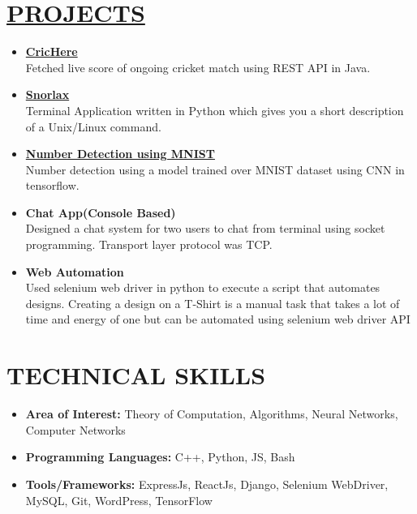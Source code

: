 \documentclass[line, margin, 12pt]{res}
\begin{document}
\begin{resume}
\section{\hyperref[https://www.github.com/darshansharma]{PROJECTS}}
\begin{itemize}
\item \textbf{\href{https://github.com/darshansharma/CricHere/blob/master/src/test/Test.java}{CricHere}}\\
Fetched live score of ongoing cricket match using REST API in Java.
\item \textbf{\href{https://github.com/darshansharma/snorlax}{Snorlax}}\\
Terminal Application written in Python which gives you a short description of a Unix/Linux command.
\item \textbf{\href{https://github.com/darshansharma/machine-learning/}{Number Detection using MNIST}}\\
Number detection using a model trained over MNIST dataset using CNN in tensorflow.
\item \textbf{Chat App(Console Based)}\\
Designed a chat system for two users to chat from terminal using socket programming. Transport layer protocol was TCP.
\item \textbf{Web Automation} \\
Used selenium web driver in python to execute a script that automates designs.
Creating a design on a T-Shirt is a manual task that takes a lot of time and energy of one but can be automated using selenium web driver API\\
\end{itemize}

\section{TECHNICAL SKILLS}
\begin{itemize}
\item \textbf{Area of Interest:} Theory of Computation, Algorithms, Neural Networks, Computer Networks
\item \textbf{Programming Languages:} C++, Python, JS, Bash
\item \textbf{Tools/Frameworks:} ExpressJs, ReactJs, Django, Selenium WebDriver, MySQL, Git, WordPress, TensorFlow\\
\end{itemize}

\end{resume}
\end{document}
